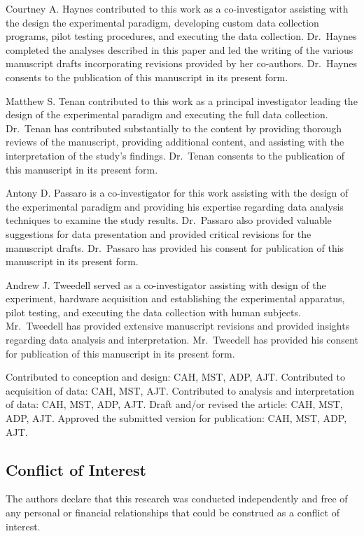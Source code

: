 \documentclass[]{cik}%
\begin{document}
Courtney A. Haynes contributed to this work as a co-investigator
assisting with the design the experimental paradigm, developing custom
data collection programs, pilot testing procedures, and executing the
data collection. Dr.~Haynes completed the analyses described in this
paper and led the writing of the various manuscript drafts incorporating
revisions provided by her co-authors. Dr.~Haynes consents to the
publication of this manuscript in its present form.

Matthew S. Tenan contributed to this work as a principal investigator
leading the design of the experimental paradigm and executing the full
data collection. Dr.~Tenan has contributed substantially to the content
by providing thorough reviews of the manuscript, providing additional
content, and assisting with the interpretation of the study's findings.
Dr.~Tenan consents to the publication of this manuscript in its present
form.

Antony D. Passaro is a co-investigator for this work assisting with the
design of the experimental paradigm and providing his expertise
regarding data analysis techniques to examine the study results.
Dr.~Passaro also provided valuable suggestions for data presentation and
provided critical revisions for the manuscript drafts. Dr.~Passaro has
provided his consent for publication of this manuscript in its present
form.

Andrew J. Tweedell served as a co-investigator assisting with design of
the experiment, hardware acquisition and establishing the experimental
apparatus, pilot testing, and executing the data collection with human
subjects. Mr.~Tweedell has provided extensive manuscript revisions and
provided insights regarding data analysis and interpretation.
Mr.~Tweedell has provided his consent for publication of this manuscript
in its present form.

Contributed to conception and design: CAH, MST, ADP, AJT. Contributed to
acquisition of data: CAH, MST, AJT. Contributed to analysis and
interpretation of data: CAH, MST, ADP, AJT. Draft and/or revised the
article: CAH, MST, ADP, AJT. Approved the submitted version for
publication: CAH, MST, ADP, AJT.

\hypertarget{conflict-of-interest}{%
\subsection{Conflict of Interest}\label{conflict-of-interest}}

The authors declare that this research was conducted independently and
free of any personal or financial relationships that could be construed
as a conflict of interest.
\end{document}
